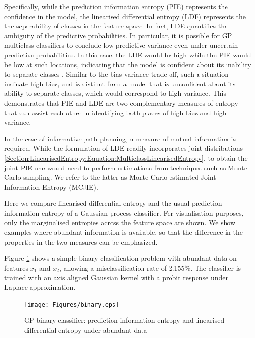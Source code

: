 \documentclass{article}
\begin{document}
		Specifically, while the prediction information entropy (PIE) represents the confidence in the model, the linearised differential entropy (LDE) represents the the separability of classes in the feature space. In fact, LDE quantifies the ambiguity of the predictive probabilities. In particular, it is possible for GP multiclass classifiers to conclude low predictive variance even under uncertain predictive probabilities. In this case, the LDE would be high while the PIE would be low at such locations, indicating that the model is confident about its inability to separate classes \cite{AsherBender}. Similar to the bias-variance trade-off, such a situation indicate high bias, and is distinct from a model that is unconfident about its ability to separate classes, which would correspond to high variance. This demonstrates that PIE and LDE are two complementary measures of entropy that can assist each other in identifying both places of high bias and high variance.
		
		In the case of informative path planning, a measure of mutual information is required. While the formulation of LDE readily incorporates joint distributions \eqref{Section:LinearisedEntropy:Equation:MulticlassLinearisedEntropy}, to obtain the joint PIE one would need to perform estimations from techniques such as Monte Carlo sampling. We refer to the latter as Monte Carlo estimated Joint Information Entropy (MCJIE).
		
		Here we compare linearised differential entropy and the usual prediction information entropy of a Gaussian process classifier. For visualisation purposes, only the marginalised entropies across the feature space are shown. We show examples where abundant information is available, so that the difference in the properties in the two measures can be emphasized. 
		
		Figure \ref{Figure:Results:BinaryLinearisedEntropy} shows a simple binary classification problem with abundant data on features $x_{1}$ and $x_{2}$, allowing a misclassification rate of 2.155\%. The classifier is trained with an axis aligned Gaussian kernel with a probit response under Laplace approximation. 

		\begin{figure}[t]
		\centering
			\texttt{[image: Figures/binary.eps]}
		\caption{GP binary classifier: prediction information entropy and linearised differential entropy under abundant data}
		\label{Figure:Results:BinaryLinearisedEntropy}
		\end{figure}
		
\end{document}
